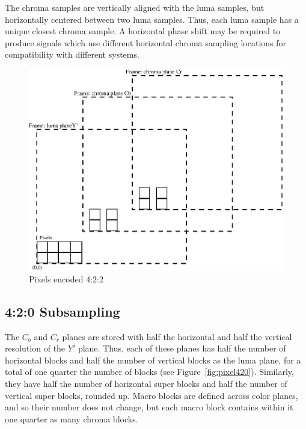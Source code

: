\documentclass[9pt,letterpaper]{book}
\numberwithin{equation}{chapter}
\numberwithin{figure}{chapter}
\numberwithin{table}{chapter}
\begin{document}
The chroma samples are vertically aligned with the luma samples, but
 horizontally centered between two luma samples.
Thus, each luma sample has a unique closest chroma sample.
A horizontal phase shift may be required to produce signals which use different
 horizontal chroma sampling locations for compatibility with different systems.

\begin{figure}[htbp]
\begin{center}
\includegraphics{pixel422}
\end{center}
\caption{Pixels encoded 4:2:2}
\label{fig:pixel422}
\end{figure}

%
%
%
%
%
%

\subsection{4:2:0 Subsampling}
\label{sec:420}

The $C_b$ and $C_r$ planes are stored with half the horizontal and half the
 vertical resolution of the $Y'$ plane.
Thus, each of these planes has half the number of horizontal blocks and half
 the number of vertical blocks as the luma plane, for a total of one quarter
 the number of blocks (see Figure~\ref{fig:pixel420}).
Similarly, they have half the number of horizontal super blocks and half the
 number of vertical super blocks, rounded up.
Macro blocks are defined across color planes, and so their number does not
 change, but each macro block contains within it one quarter as many 
 chroma blocks.
\end{document}
